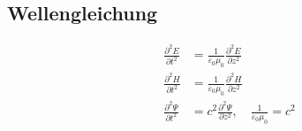 \subsection{Wellengleichung}
\begin{align*}
    \frac{\partial^2 E}{\partial t^2} &= \frac{1}{\varepsilon_0 \mu_0} \frac{\partial^2 E}{\partial z^2}\\
    \frac{\partial^2 H}{\partial t^2} &= \frac{1}{\varepsilon_0 \mu_0} \frac{\partial^2 H}{\partial z^2}\\
    \frac{\partial^2 \Psi}{\partial t^2} &= c^2 \frac{\partial^2 \Psi}{\partial z^2}, \quad \frac{1}{\varepsilon_0 \mu_0} = c^2
\end{align*}
\vspace*{0em}